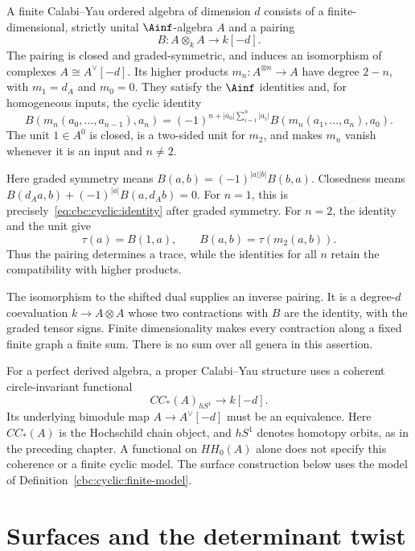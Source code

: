 \begin{definition}\label{cbc:cyclic:finite-model}
A finite Calabi--Yau ordered algebra of dimension $d$ consists of a finite-dimensional, strictly unital $\Ainf$-algebra $A$ and a pairing
\[
 B:A\otimes_k A\longrightarrow k[-d].
\]
The pairing is closed and graded-symmetric, and induces an isomorphism of complexes $A\cong A^\vee[-d]$.
Its higher products $m_n:A^{\otimes n}\to A$ have degree $2-n$, with $m_1=d_A$ and $m_0=0$.
They satisfy the $\Ainf$ identities and, for homogeneous inputs, the cyclic identity
\begin{equation}\label{eq:cbc:cyclic:identity}
 B(m_n(a_0,\ldots,a_{n-1}),a_n)
 =(-1)^{n+|a_0|\sum_{i=1}^n|a_i|}
 B(m_n(a_1,\ldots,a_n),a_0).
\end{equation}
The unit $1\in A^0$ is closed, is a two-sided unit for $m_2$, and makes $m_n$ vanish whenever it is an input and $n\ne2$.
\end{definition}

Here graded symmetry means $B(a,b)=(-1)^{|a||b|}B(b,a)$.
Closedness means $B(d_Aa,b)+(-1)^{|a|}B(a,d_Ab)=0$.
For $n=1$, this is precisely~\eqref{eq:cbc:cyclic:identity} after graded symmetry.
For $n=2$, the identity and the unit give
\[
 \tau(a)=B(1,a),\qquad B(a,b)=\tau(m_2(a,b)).
\]
Thus the pairing determines a trace, while the identities for all $n$ retain the compatibility with higher products.

The isomorphism to the shifted dual supplies an inverse pairing.
It is a degree-$d$ coevaluation $k\to A\otimes A$ whose two contractions with $B$ are the identity, with the graded tensor signs.
Finite dimensionality makes every contraction along a fixed finite graph a finite sum.
There is no sum over all genera in this assertion.

For a perfect derived algebra, a proper Calabi--Yau structure uses a coherent circle-invariant functional
\[
 CC_*(A)_{hS^1}\longrightarrow k[-d].
\]
Its underlying bimodule map $A\to A^\vee[-d]$ must be an equivalence.
Here $CC_*(A)$ is the Hochschild chain object, and $hS^1$ denotes homotopy orbits, as in the preceding chapter.
A functional on $HH_0(A)$ alone does not specify this coherence or a finite cyclic model.
The surface construction below uses the model of Definition~\ref{cbc:cyclic:finite-model}.

\section{Surfaces and the determinant twist}

